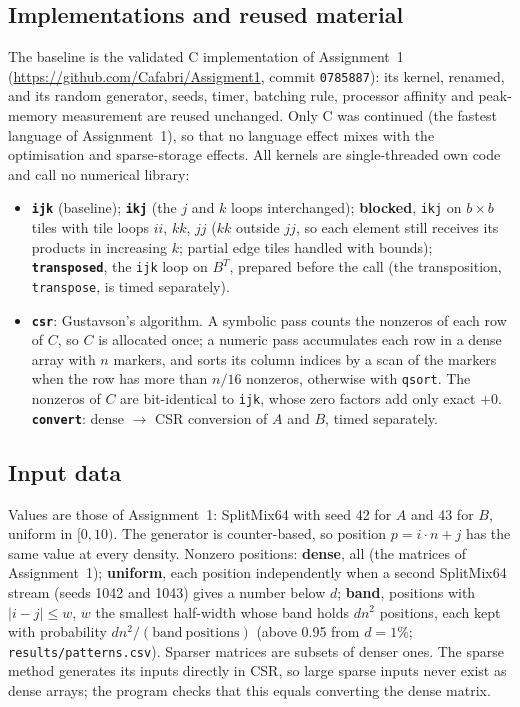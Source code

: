 \documentclass[11pt,a4paper]{article}
\begin{document}
\subsection{Implementations and reused material}

The baseline is the validated C implementation of Assignment~1
(\url{https://github.com/Cafabri/Assigment1}, commit \texttt{0785887}): its kernel, renamed,
and its random generator, seeds, timer, batching rule, processor affinity and peak-memory
measurement are reused unchanged. Only C was continued (the fastest language of
Assignment~1), so that no language effect mixes with the optimisation and sparse-storage
effects. All kernels are single-threaded own code and call no numerical library:
\begin{itemize}
    \item \textbf{\texttt{ijk}} (baseline); \textbf{\texttt{ikj}} (the $j$ and $k$ loops
    interchanged); \textbf{blocked}, \texttt{ikj} on $b \times b$ tiles with tile loops
    $ii$, $kk$, $jj$ ($kk$ outside $jj$, so each element still receives its products in
    increasing $k$; partial edge tiles handled with bounds); \textbf{\texttt{transposed}},
    the \texttt{ijk} loop on $B^T$, prepared before the call (the transposition,
    \texttt{transpose}, is timed separately).
    \item \textbf{\texttt{csr}}: Gustavson's algorithm. A symbolic pass counts the nonzeros
    of each row of $C$, so $C$ is allocated once; a numeric pass accumulates each row in a
    dense array with $n$ markers, and sorts its column indices by a scan of the markers when
    the row has more than $n/16$ nonzeros, otherwise with \texttt{qsort}. The nonzeros of $C$
    are bit-identical to \texttt{ijk}, whose zero factors add only exact $+0$.
    \textbf{\texttt{convert}}: dense $\to$ CSR conversion of $A$ and $B$, timed separately.
\end{itemize}

\subsection{Input data}

Values are those of Assignment~1: SplitMix64 with seed 42 for $A$ and 43 for $B$, uniform
in $[0, 10)$. The generator is counter-based, so position $p = i \cdot n + j$ has the same
value at every density. Nonzero positions: \textbf{dense}, all (the matrices of
Assignment~1); \textbf{uniform}, each position independently when a second SplitMix64 stream
(seeds 1042 and 1043) gives a number below $d$; \textbf{band}, positions with
$|i - j| \le w$, $w$ the smallest half-width whose band holds $d n^2$ positions, each kept
with probability $d n^2 / (\mathrm{band\ positions})$ (above 0.95 from $d = 1\%$;
\texttt{results/patterns.csv}). Sparser matrices are subsets of denser ones. The sparse
method generates its inputs directly in CSR, so large sparse inputs never exist as dense
arrays; the program checks that this equals converting the dense matrix.
\end{document}
